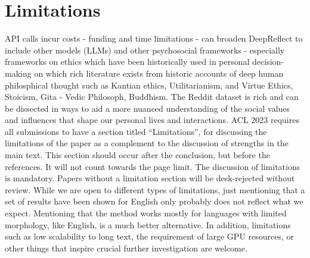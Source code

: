 \section*{Limitations}\label{sec:limitations}
\textcolor{black!40}{API calls incur costs - funding and time limitations - can broaden DeepReflect to include other models (LLMs) and other psychosocial frameworks - especially frameworks on ethics which have been historically used in personal decision-making on which rich literature exists from historic accounts of deep human philosphical thought such as Kantian ethics, Utilitarianism, and Virtue Ethics, Stoicism, Gita - Vedic Philosoph, Buddhism. The Reddit dataset is rich and can be dissected in ways to aid a more nuanced understanding of the social values and influences that shape our personal lives and interactions.}
\textcolor{black!30}{ACL 2023 requires all submissions to have a section titled ``Limitations'', for discussing the limitations of the paper as a complement to the discussion of strengths in the main text. This section should occur after the conclusion, but before the references. It will not count towards the page limit.
The discussion of limitations is mandatory. Papers without a limitation section will be desk-rejected without review.}
\textcolor{black!30}{While we are open to different types of limitations, just mentioning that a set of results have been shown for English only probably does not reflect what we expect. Mentioning that the method works mostly for languages with limited morphology, like English, is a much better alternative.}
\textcolor{black!30}{In addition, limitations such as low scalability to long text, the requirement of large GPU resources, or other things that inspire crucial further investigation are welcome.}